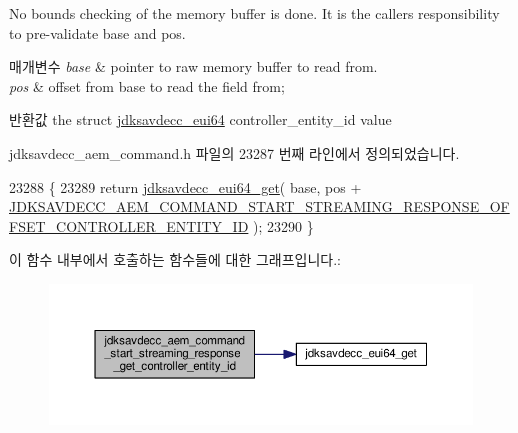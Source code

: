 No bounds checking of the memory buffer is done. It is the caller\textquotesingle{}s responsibility to pre-\/validate base and pos.


\begin{DoxyParams}{매개변수}
{\em base} & pointer to raw memory buffer to read from. \\
\hline
{\em pos} & offset from base to read the field from; \\
\hline
\end{DoxyParams}
\begin{DoxyReturn}{반환값}
the struct \hyperlink{structjdksavdecc__eui64}{jdksavdecc\+\_\+eui64} controller\+\_\+entity\+\_\+id value 
\end{DoxyReturn}


jdksavdecc\+\_\+aem\+\_\+command.\+h 파일의 23287 번째 라인에서 정의되었습니다.


\begin{DoxyCode}
23288 \{
23289     \textcolor{keywordflow}{return} \hyperlink{group__eui64_ga2652311a25a6b91cddbed75c108c7031}{jdksavdecc\_eui64\_get}( base, pos + 
      \hyperlink{group__command__start__streaming__response_ga6bf6c059a92fa2a49b6ffa30a2cfd6b8}{JDKSAVDECC\_AEM\_COMMAND\_START\_STREAMING\_RESPONSE\_OFFSET\_CONTROLLER\_ENTITY\_ID}
       );
23290 \}
\end{DoxyCode}


이 함수 내부에서 호출하는 함수들에 대한 그래프입니다.\+:
\nopagebreak
\begin{figure}[H]
\begin{center}
\leavevmode
\includegraphics[width=350pt]{group__command__start__streaming__response_ga30577b0b98a7a01bcaef2664db268bf7_cgraph}
\end{center}
\end{figure}


